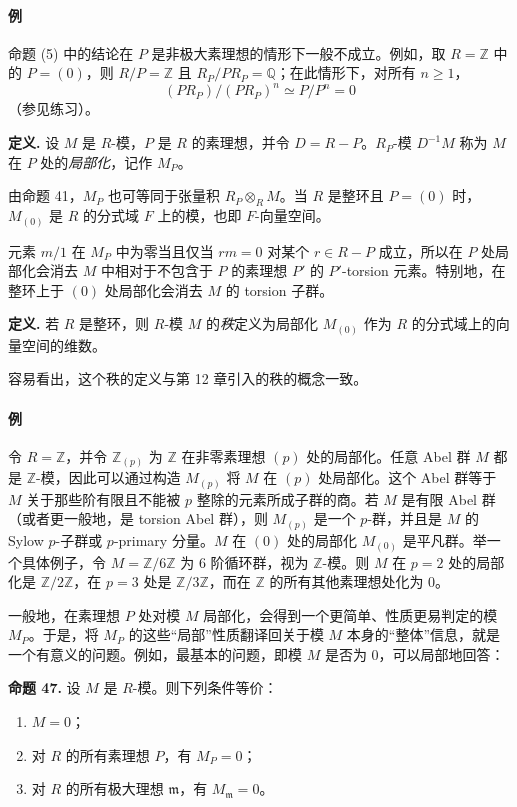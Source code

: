 \paragraph{例}
命题 (5) 中的结论在 $P$ 是非极大素理想的情形下一般不成立。例如，取 $R=\mathbb Z$ 中的 $P=(0)$，则 $R/P=\mathbb Z$ 且 $R_P/PR_P=\mathbb Q$；在此情形下，对所有 $n\ge1$，
\[
(PR_P)/(PR_P)^n\simeq P/P^n=0
\]
（参见练习）。

\noindent\textbf{定义.} 设 $M$ 是 $R$-模，$P$ 是 $R$ 的素理想，并令 $D=R-P$。$R_P$-模 $D^{-1}M$ 称为 $M$ 在 $P$ 处的\emph{局部化}，记作 $M_P$。

由命题 41，$M_P$ 也可等同于张量积 $R_P\otimes_R M$。当 $R$ 是整环且 $P=(0)$ 时，$M_{(0)}$ 是 $R$ 的分式域 $F$ 上的模，也即 $F$-向量空间。

元素 $m/1$ 在 $M_P$ 中为零当且仅当 $rm=0$ 对某个 $r\in R-P$ 成立，所以在 $P$ 处局部化会消去 $M$ 中相对于不包含于 $P$ 的素理想 $P'$ 的 $P'$-torsion 元素。特别地，在整环上于 $(0)$ 处局部化会消去 $M$ 的 torsion 子群。

\noindent\textbf{定义.} 若 $R$ 是整环，则 $R$-模 $M$ 的\emph{秩}定义为局部化 $M_{(0)}$ 作为 $R$ 的分式域上的向量空间的维数。

容易看出，这个秩的定义与第 12 章引入的秩的概念一致。

\paragraph{例}
令 $R=\mathbb Z$，并令 $\mathbb Z_{(p)}$ 为 $\mathbb Z$ 在非零素理想 $(p)$ 处的局部化。任意 Abel 群 $M$ 都是 $\mathbb Z$-模，因此可以通过构造 $M_{(p)}$ 将 $M$ 在 $(p)$ 处局部化。这个 Abel 群等于 $M$ 关于那些阶有限且不能被 $p$ 整除的元素所成子群的商。若 $M$ 是有限 Abel 群（或者更一般地，是 torsion Abel 群），则 $M_{(p)}$ 是一个 $p$-群，并且是 $M$ 的 Sylow $p$-子群或 $p$-primary 分量。$M$ 在 $(0)$ 处的局部化 $M_{(0)}$ 是平凡群。举一个具体例子，令 $M=\mathbb Z/6\mathbb Z$ 为 6 阶循环群，视为 $\mathbb Z$-模。则 $M$ 在 $p=2$ 处的局部化是 $\mathbb Z/2\mathbb Z$，在 $p=3$ 处是 $\mathbb Z/3\mathbb Z$，而在 $\mathbb Z$ 的所有其他素理想处化为 $0$。

一般地，在素理想 $P$ 处对模 $M$ 局部化，会得到一个更简单、性质更易判定的模 $M_P$。于是，将 $M_P$ 的这些“局部”性质翻译回关于模 $M$ 本身的“整体”信息，就是一个有意义的问题。例如，最基本的问题，即模 $M$ 是否为 $0$，可以局部地回答：

\noindent\textbf{命题 47.} 设 $M$ 是 $R$-模。则下列条件等价：
\begin{enumerate}[label=(\arabic*)]
	\item $M=0$；
	\item 对 $R$ 的所有素理想 $P$，有 $M_P=0$；
	\item 对 $R$ 的所有极大理想 $\mathfrak m$，有 $M_{\mathfrak m}=0$。
\end{enumerate}

